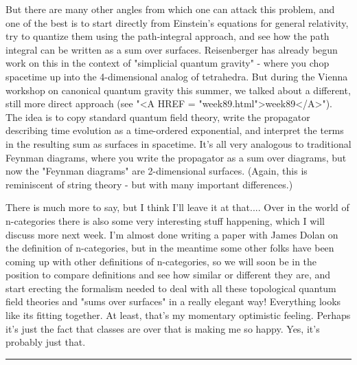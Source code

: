 But there are many other angles from which one can attack this problem,
and one of the best is to start directly from Einstein's equations
for general relativity, try to quantize them using the path-integral
approach, and see how the path integral can be written as a sum over
surfaces.  Reisenberger has already begun work on this in the context of
"simplicial quantum gravity" - where you chop spacetime up into 
the 4-dimensional analog of tetrahedra.   But during the Vienna workshop
on canonical quantum gravity this summer, we talked about a different,
still more direct approach (see "<A HREF = "week89.html">week89</A>").  The idea is to copy standard
quantum field theory, write the propagator describing time evolution
as a time-ordered exponential, and interpret the terms in the resulting
sum as surfaces in spacetime.  It's all very analogous to traditional
Feynman diagrams, where you write the propagator as a sum over diagrams,
but now the "Feynman diagrams" are 2-dimensional surfaces.   (Again, this
is reminiscent of string theory - but with many important differences.)

There is much more to say, but I think I'll leave it at that.... 
Over in the world of n-categories there is also some very interesting 
stuff happening, which I will discuss more next week.  I'm almost done
writing a paper with James Dolan on the definition of n-categories, but 
in the meantime some other folks have been coming up with other definitions of
n-categories, so we will soon be in the position to compare definitions and
see how similar or different they are, and start erecting the formalism
needed to deal with all these topological quantum field theories and
"sums over surfaces" in a really elegant way!  Everything looks like its
fitting together.  At least, that's my momentary optimistic feeling.  
Perhaps it's just the fact that classes are over that is making me so happy.  
Yes, it's probably just that.

\par\noindent\rule{\textwidth}{0.4pt}

